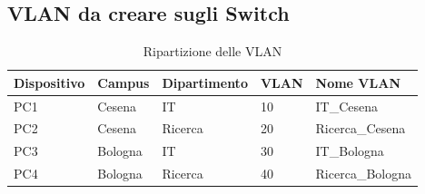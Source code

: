 \documentclass[a4paper,12pt]{report}
\begin{document}
\subsection{VLAN da creare sugli Switch}
\begin{table}[H]
\begin{tabular}{@{}lllll@{}}
\toprule
Dispositivo & Campus & Dipartimento & VLAN & Nome VLAN \\ \midrule
PC1 & Cesena & IT & 10 & IT\_Cesena \\
PC2 & Cesena & Ricerca & 20 & Ricerca\_Cesena \\
PC3 & Bologna & IT & 30 & IT\_Bologna \\
PC4 & Bologna & Ricerca & 40 & Ricerca\_Bologna \\ \bottomrule
\end{tabular}
\caption{Ripartizione delle VLAN}
\label{table:vlan_division}
\end{table}
\end{document}

